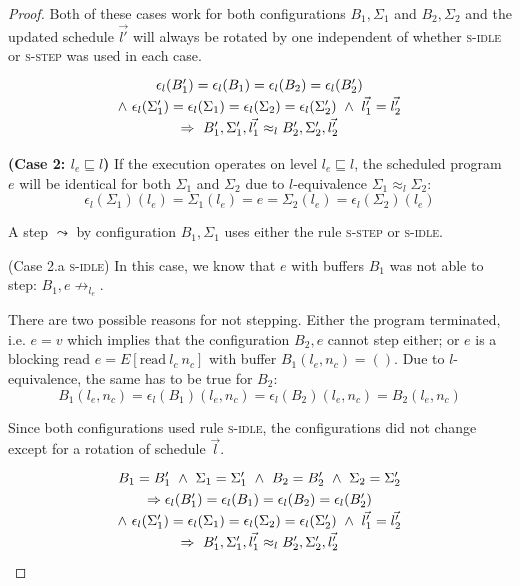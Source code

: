 \documentclass[10pt,preprint]{sigplanconf}
\newcommand{\arrayStretch}{1.28}
\begin{document}
\begin{proof}
Both of these cases work for both configurations $B_1, \Sigma_1$ and $B_2, \Sigma_2$ and the updated schedule $\vec{l'}$ will always be rotated by one independent of whether \textsc{s-idle} or \textsc{s-step} was used in each case.
\[\arraycolsep=1.6pt\def\arraystretch{\arrayStretch}
\begin{array}{c}
  \epsilon_l(B'_1) = \epsilon_l(B_1) = \epsilon_l(B_2) = \epsilon_l(B'_2)\\
  \wedge~\epsilon_l(\Sigma'_1) = \epsilon_l(\Sigma_1) = \epsilon_l(\Sigma_2) = \epsilon_l(\Sigma'_2) ~\wedge~\vec{l'_1} = \vec{l'_2} \\
  \Rightarrow~B'_1,\Sigma'_1, \vec{l'_1} \approx_l B'_2,\Sigma'_2, \vec{l'_2}
\end{array} \]

\textbf{(Case 2: $l_e \sqsubseteq l$)} If the execution operates on level $l_e \sqsubseteq l$, the scheduled program $e$ will be identical for both $\Sigma_1$ and $\Sigma_2$ due to $l$-equivalence $\Sigma_1 \approx_l \Sigma_2$:
\[ \epsilon_l(\Sigma_1)(l_e) = \Sigma_1(l_e) = e = \Sigma_2(l_e) = \epsilon_l(\Sigma_2)(l_e) \]

A step $\leadsto$ by configuration $B_1,\Sigma_1$ uses either the rule \textsc{s-step} or \textsc{s-idle}.

(Case 2.a \textsc{s-idle}) In this case, we know that $e$ with buffers $B_1$ was not able to step: $B_1,e \not \rightarrow_{l_e}$.

  There are two possible reasons for not stepping.  Either the program terminated, i.e. $e=v$ which implies that the configuration $B_2,e$ cannot step either; or $e$ is a blocking read $e = E[\text{read}~l_c~n_c]$ with buffer $B_1(l_e, n_c) = ()$.  Due to $l$-equivalence, the same has to be true for $B_2$:
  \[ B_1(l_e,n_c) = \epsilon_l(B_1)(l_e,n_c) = \epsilon_l(B_2)(l_e,n_c) = B_2(l_e,n_c) \]

  Since both configurations used rule \textsc{s-idle}, the configurations did not change except for a rotation of schedule $\vec{l}$.
\[\arraycolsep=1.6pt\def\arraystretch{\arrayStretch}
\begin{array}{c}
  B_1 = B'_1 ~\wedge~ \Sigma_1 = \Sigma'_1~\wedge~B_2 = B'_2 ~\wedge~ \Sigma_2 = \Sigma'_2 \\
  \Rightarrow \epsilon_l(B'_1) = \epsilon_l(B_1) = \epsilon_l(B_2) = \epsilon_l(B'_2)\\
  \wedge~\epsilon_l(\Sigma'_1) = \epsilon_l(\Sigma_1) = \epsilon_l(\Sigma_2) = \epsilon_l(\Sigma'_2) ~\wedge~\vec{l'_1} = \vec{l'_2} \\
  \Rightarrow~B'_1,\Sigma'_1, \vec{l'_1} \approx_l B'_2,\Sigma'_2, \vec{l'_2}
\end{array} \]


\end{proof}
\end{document}
